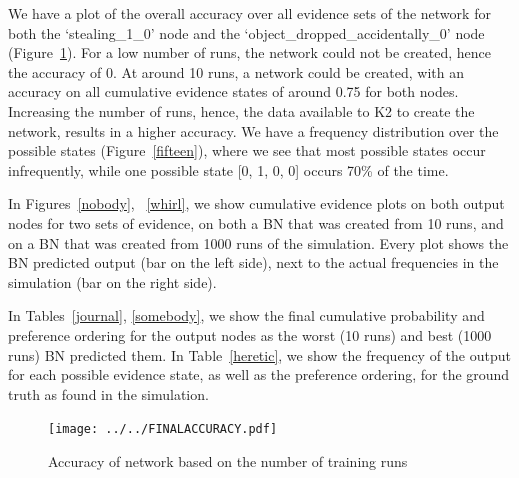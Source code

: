 \documentclass[12pt]{article}
\begin{document}
We have a plot of the overall accuracy over all evidence sets of the network for both the `stealing\_1\_0' node and the `object\_dropped\_accidentally\_0' node (Figure~\ref{girl}). For a low number of runs, the network could not be created, hence the accuracy of 0. At around 10 runs, a network could be created, with an accuracy on all cumulative evidence states of around 0.75 for both nodes. Increasing the number of runs, hence, the data available to K2 to create the network, results in a higher accuracy. We have a frequency distribution over the possible states (Figure~\ref{fifteen}), where we see that most possible states occur infrequently, while one possible state [0, 1, 0, 0] occurs 70\% of the time. 

In Figures~\ref{nobody}, ~\ref{whirl}, we show cumulative evidence plots on both output nodes for two sets of evidence, on both a BN that was created from 10 runs, and on a BN that was created from 1000 runs of the simulation. Every plot shows the BN predicted output (bar on the left side), next to the actual frequencies in the simulation (bar on the right side).

In Tables~\ref{journal}, \ref{somebody}, we show the final cumulative probability and preference ordering for the output nodes as the worst (10 runs) and best (1000 runs) BN predicted them. In Table~\ref{heretic}, we show the frequency of the output for each possible evidence state, as well as the preference ordering, for the ground truth as found in the simulation.



\begin{figure}[htbp]
\begin{center}
\texttt{[image: ../../FINALACCURACY.pdf]}
\caption{Accuracy of network based on the number of training runs}
\label{girl}
\end{center}
\end{figure}
\end{document}

